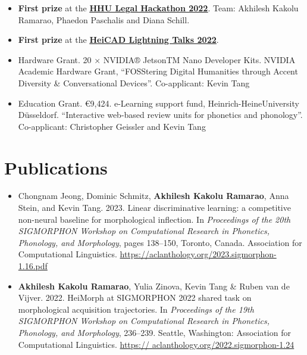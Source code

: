 \documentclass[11pt,a4paper,sans]{moderncv}
\begin{document}
\vspace{3pt}

\begin{itemize}
    \item \textbf{First prize} at the \textbf{\underline{\href{https://www.heicad.hhu.de/aktivitaeten/hhu-legal-hackathon-2022}{HHU Legal Hackathon 2022}}}. Team: Akhilesh Kakolu Ramarao, Phaedon Paschalis and Diana Schill.
    
    \item \textbf{First prize} at the \textbf{\underline{\href{https://www.heicad.hhu.de/aktivitaeten/lightning-talks-2022}{HeiCAD Lightning Talks 2022}}}.
    
    \item Hardware Grant. 20 × NVIDIA® JetsonTM Nano Developer Kits. NVIDIA Academic Hardware Grant, “FOSStering Digital Humanities through Accent Diversity \& Conversational Devices”. Co-applicant: Kevin Tang
    
    \item Education Grant. €9,424. e-Learning support fund, Heinrich-HeineUniversity Düsseldorf. “Interactive web-based review units for phonetics and phonology”. Co-applicant: Christopher Geissler and Kevin Tang 
    
\end{itemize}

\section{Publications}

\vspace{3pt}

\begin{itemize}
  \item Chongnam Jeong, Dominic Schmitz, \textbf{Akhilesh Kakolu Ramarao}, Anna Stein, and Kevin Tang. 2023. Linear discriminative learning: a competitive non-neural baseline for morphological inflection. In \textit{Proceedings of the 20th SIGMORPHON Workshop on Computational Research in Phonetics, Phonology, and Morphology}, pages 138–150, Toronto, Canada. Association for Computational Linguistics.
  \url{https://aclanthology.org/2023.sigmorphon-1.16.pdf}
  \item \textbf{Akhilesh Kakolu Ramarao}, Yulia Zinova, Kevin Tang \& Ruben van de Vijver. 2022. HeiMorph at SIGMORPHON 2022 shared task on morphological acquisition trajectories. In \textit{Proceedings of the 19th SIGMORPHON Workshop on Computational Research in Phonetics, Phonology, and Morphology}, 236–239. Seattle, Washington: Association for Computational Linguistics. \url{https:// aclanthology.org/2022.sigmorphon-1.24} 
\end{itemize}
\end{document}
